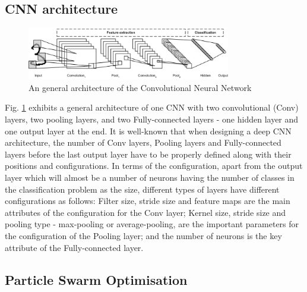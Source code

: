 \documentclass[conference]{IEEEtran}
\begin{document}
\subsection{CNN architecture}\label{sec:CNNArchitecture}

\begin{figure}[!t]
	\centering
	\includegraphics[width=3.5in]{cnn_architecture}
	\caption{An general architecture of the Convolutional Neural Network \cite{CNNFig:Tim}}
	\label{fig:CNNArchitecture}
\end{figure}

Fig. \ref{fig:CNNArchitecture} exhibits a general architecture of one CNN with two convolutional (Conv) layers, two pooling layers, and two Fully-connected layers - one hidden layer and one output layer at the end. It is well-known that when designing a deep CNN architecture, the number of Conv layers, Pooling layers and Fully-connected layers before the last output layer have to be properly defined along with their positions and configurations. In terms of the configuration, apart from the output layer which will almost be a number of neurons having the number of classes in the classification problem as the size, different types of layers have different configurations as follows: Filter size, stride size and feature maps are the main attributes of the configuration for the Conv layer; Kernel size, stride size and pooling type - max-pooling or average-pooling, are the important parameters for the configuration of the Pooling layer; and the number of neurons is the key attribute of the Fully-connected layer. %

\subsection{Particle Swarm Optimisation}
\end{document}
